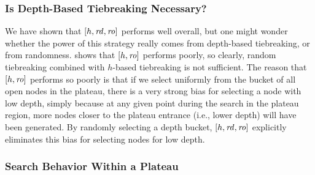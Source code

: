 
\subsubsection{Is Depth-Based Tiebreaking Necessary?}

We have shown that $[h,{\mbox{\textit{rd}}},{\mbox{\textit{ro}}}]$ performs well overall, but
one might wonder whether the power of this strategy really comes from depth-based tiebreaking, or from randomness.
 shows that $[h,{\mbox{\textit{ro}}}]$ performs poorly, so clearly, random tiebreaking combined with $h$-based tiebreaking is not sufficient.
The reason that $[h,{\mbox{\textit{ro}}}]$ performs so poorly is that if we select uniformly from the bucket of all open nodes in the plateau, there is a very strong bias for selecting a node with low depth, simply because at any given point during the search in the plateau region, more nodes closer to the plateau entrance (i.e., lower depth) will have been generated.
By randomly selecting a depth bucket, $[h,{\mbox{\textit{rd}}},{\mbox{\textit{ro}}}]$ explicitly eliminates this bias for selecting nodes for low depth.



\subsubsection{Search Behavior Within a Plateau}

